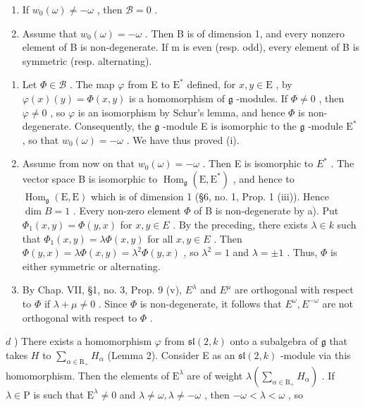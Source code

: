 \begin{enumerate}
\def\labelenumi{(\roman{enumi})}
\item
  If \(w_0(\omega) \neq -\omega\) , then \(\mathcal{B} = 0\) .
\item
  Assume that \(w_{0}(\omega) = -\omega\) . Then B is of dimension 1, and every nonzero element of B is non-degenerate. If m is even (resp. odd), every element of B is symmetric (resp. alternating).
\end{enumerate}

\begin{enumerate}
\def\labelenumi{\alph{enumi})}
\item
  Let \(\Phi \in \mathcal{B}\) . The map \(\varphi\) from E to \(\mathrm{E}^*\) defined, for \(x, y \in \mathrm{E}\) , by \(\varphi(x)(y) = \Phi(x, y)\) is a homomorphism of \(\mathfrak{g}\) -modules. If \(\Phi \neq 0\) , then \(\varphi \neq 0\) , so \(\varphi\) is an isomorphism by Schur's lemma, and hence \(\Phi\) is non-degenerate. Consequently, the \(\mathfrak{g}\) -module E is isomorphic to the \(\mathfrak{g}\) -module \(\mathrm{E}^*\) , so that \(w_0(\omega) = -\omega\) . We have thus proved (i).
\item
  Assume from now on that \(w_{0}(\omega) = -\omega\) . Then E is isomorphic to \(E^{*}\) . The vector space B is isomorphic to \(\operatorname{Hom}_{\mathfrak{g}}(\mathrm{E}, \mathrm{E}^{*})\) , and hence to \(\operatorname{Hom}_{\mathfrak{g}}(\mathrm{E}, \mathrm{E})\) which is of dimension 1 (§6, no. 1, Prop. 1 (iii)). Hence \(\dim B = 1\) . Every non-zero element \(\Phi\) of B is non-degenerate by a). Put \(\Phi_{1}(x, y) = \Phi(y, x)\) for \(x, y \in E\) . By the preceding, there exists \(\lambda \in k\) such that \(\Phi_{1}(x, y) = \lambda \Phi(x, y)\) for all \(x, y \in E\) . Then \(\Phi(y, x) = \lambda \Phi(x, y) = \lambda^{2} \Phi(y, x)\) , so \(\lambda^{2} = 1\) and \(\lambda = \pm 1\) . Thus, \(\Phi\) is either symmetric or alternating.
\item
  By Chap. VII, §1, no. 3, Prop. 9 (v), \(E^{\lambda}\) and \(E^{\mu}\) are orthogonal with respect to \(\Phi\) if \(\lambda + \mu \neq 0\) . Since \(\Phi\) is non-degenerate, it follows that \(E^{\omega}, E^{-\omega}\) are not orthogonal with respect to \(\Phi\) .
\end{enumerate}

\(d\) ) There exists a homomorphism \(\varphi\) from \(\mathfrak{sl}(2,k)\) onto a subalgebra of \(\mathfrak{g}\) that takes \(H\) to \(\sum_{\alpha \in \mathrm{R}_{+}}H_{\alpha}\) (Lemma 2). Consider E as an \(\mathfrak{sl}(2,k)\) -module via this homomorphism. Then the elements of \(\mathrm{E}^{\lambda}\) are of weight \(\lambda \left(\sum_{\alpha \in \mathrm{R}_{+}}H_\alpha\right)\) . If \(\lambda \in \mathrm{P}\) is such that \(\mathrm{E}^{\lambda} \neq 0\) and \(\lambda \neq \omega, \lambda \neq -\omega\) , then \(-\omega < \lambda < \omega\) , so

